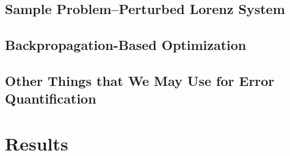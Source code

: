 \documentclass[12pt]{article}
\begin{document}
\subsection{Sample Problem\---Perturbed Lorenz System}

\subsection{Backpropagation-Based Optimization}

\subsection{Other Things that We May Use for Error Quantification}



\section{Results}



\nocite{*}

\end{document}
